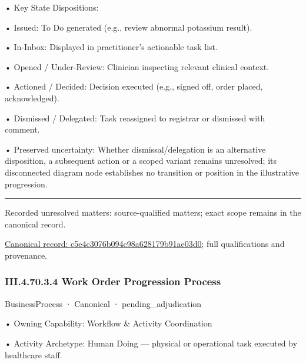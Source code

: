 •
Key State Dispositions:



•
Issued: To Do generated (e.g., review abnormal potassium result).



•
In-Inbox: Displayed in practitioner's actionable task list.



•
Opened / Under-Review: Clinician inspecting relevant clinical context.



•
Actioned / Decided: Decision executed (e.g., signed off, order placed, acknowledged).



•
Dismissed / Delegated: Task reassigned to registrar or dismissed with comment.



•
Preserved uncertainty: Whether dismissal/delegation is an alternative disposition, a subsequent action or a scoped variant remains unresolved; its disconnected diagram node establishes no transition or position in the illustrative progression.



\medskip\hrule\medskip

{\small Recorded unresolved matters: source-qualified matters; exact scope remains in the canonical record.}\par
{\footnotesize \href{../../../../continuum/business/business-process/c5e4c3076b094c98a628179b91ae03d0.md}{Canonical record: c5e4c3076b094c98a628179b91ae03d0}; full qualifications and provenance.}\par
\subsubsection*{III.4.70.3.4 Work Order Progression Process}
\label{navigation:III.4.70.3.4}

\label{element:73fbbe4e027b4805809fad430e791eba}
{\small BusinessProcess · Canonical · pending\_adjudication}\par

•
Owning Capability: Workflow \& Activity Coordination



•
Activity Archetype: Human Doing — physical or operational task executed by healthcare staff.



